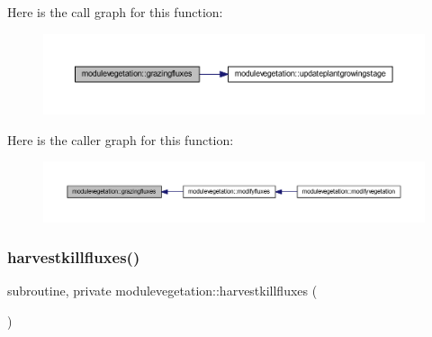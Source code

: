Here is the call graph for this function\+:\nopagebreak
\begin{figure}[H]
\begin{center}
\leavevmode
\includegraphics[width=350pt]{namespacemodulevegetation_a6171f7a4fbe04e9636476d638cf27f05_cgraph}
\end{center}
\end{figure}
Here is the caller graph for this function\+:\nopagebreak
\begin{figure}[H]
\begin{center}
\leavevmode
\includegraphics[width=350pt]{namespacemodulevegetation_a6171f7a4fbe04e9636476d638cf27f05_icgraph}
\end{center}
\end{figure}
\mbox{\label{namespacemodulevegetation_a68c29b5f11f8bae818809241e638e11a}} 
\subsubsection{\texorpdfstring{harvestkillfluxes()}{harvestkillfluxes()}}
{\footnotesize\ttfamily subroutine, private modulevegetation\+::harvestkillfluxes (\begin{DoxyParamCaption}{ }\end{DoxyParamCaption})\hspace{0.3cm}{\ttfamily [private]}}

